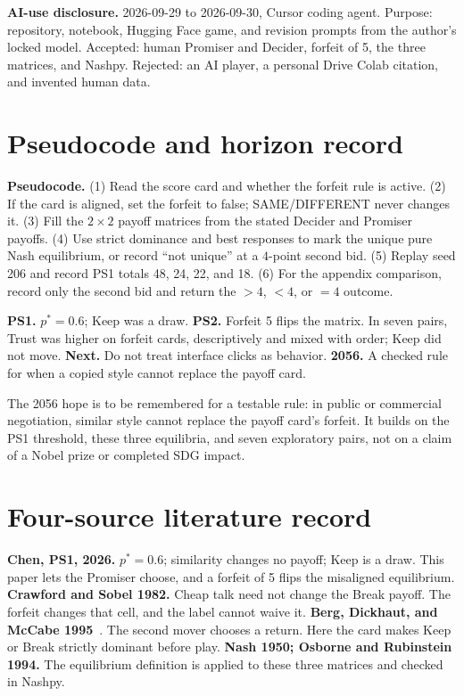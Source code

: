 \textbf{AI-use disclosure.} 2026-09-29 to 2026-09-30, Cursor coding agent. Purpose: repository, notebook, Hugging Face game, and revision prompts from the author's locked model. Accepted: human Promiser and Decider, forfeit of 5, the three matrices, and Nashpy. Rejected: an AI player, a personal Drive Colab citation, and invented human data.

\section{Pseudocode and horizon record}
\textbf{Pseudocode.} (1) Read the score card and whether the forfeit rule is active. (2) If the card is aligned, set the forfeit to false; SAME/DIFFERENT never changes it. (3) Fill the $2\times2$ payoff matrices from the stated Decider and Promiser payoffs. (4) Use strict dominance and best responses to mark the unique pure Nash equilibrium, or record ``not unique'' at a $4$-point second bid. (5) Replay seed 206 and record PS1 totals 48, 24, 22, and 18. (6) For the appendix comparison, record only the second bid and return the $>4$, $<4$, or $=4$ outcome.

\textbf{PS1.} $p^\ast=0.6$; Keep was a draw. \textbf{PS2.} Forfeit 5 flips the matrix. In seven pairs, Trust was higher on forfeit cards, descriptively and mixed with order; Keep did not move. \textbf{Next.} Do not treat interface clicks as behavior. \textbf{2056.} A checked rule for when a copied style cannot replace the payoff card.

The 2056 hope is to be remembered for a testable rule: in public or commercial negotiation, similar style cannot replace the payoff card's forfeit. It builds on the PS1 threshold, these three equilibria, and seven exploratory pairs, not on a claim of a Nobel prize or completed SDG impact.

\section{Four-source literature record}
\textbf{Chen, PS1, 2026.} $p^\ast=0.6$; similarity changes no payoff; Keep is a draw. This paper lets the Promiser choose, and a forfeit of 5 flips the misaligned equilibrium. \textbf{Crawford and Sobel 1982.} Cheap talk need not change the Break payoff. The forfeit changes that cell, and the label cannot waive it. \textbf{Berg, Dickhaut, and McCabe 1995}~\cite{berg1995}. The second mover chooses a return. Here the card makes Keep or Break strictly dominant before play. \textbf{Nash 1950; Osborne and Rubinstein 1994.} The equilibrium definition is applied to these three matrices and checked in Nashpy.

